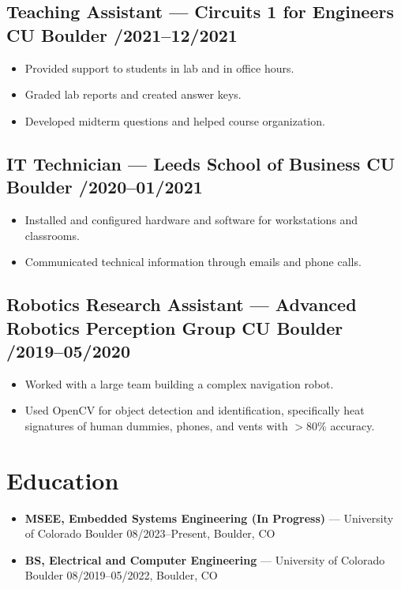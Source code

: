 \documentclass[11pt]{article}
\begin{document}
\subsection*{Teaching Assistant --- Circuits 1 for Engineers \hfill CU Boulder /2021--12/2021}
\begin{itemize}[leftmargin=*]
\item Provided support to students in lab and in office hours.
\item Graded lab reports and created answer keys.
\item Developed midterm questions and helped course organization.
\end{itemize}

\subsection*{IT Technician --- Leeds School of Business \hfill CU Boulder /2020--01/2021}
\begin{itemize}[leftmargin=*]
\item Installed and configured hardware and software for workstations and classrooms.
\item Communicated technical information through emails and phone calls.
\end{itemize}

\subsection*{Robotics Research Assistant --- Advanced Robotics Perception Group \hfill CU Boulder /2019--05/2020}
\begin{itemize}[leftmargin=*]
\item Worked with a large team building a complex navigation robot.
\item Used OpenCV for object detection and identification, specifically heat signatures of human dummies, phones, and vents with $>80\%$ accuracy.
\end{itemize}

\section*{Education}
\begin{itemize}[leftmargin=*]
\item \textbf{MSEE, Embedded Systems Engineering (In Progress)} --- University of Colorado Boulder \hfill 08/2023--Present, Boulder, CO
\item \textbf{BS, Electrical and Computer Engineering} --- University of Colorado Boulder \hfill 08/2019--05/2022, Boulder, CO
\end{itemize}
\end{document}
